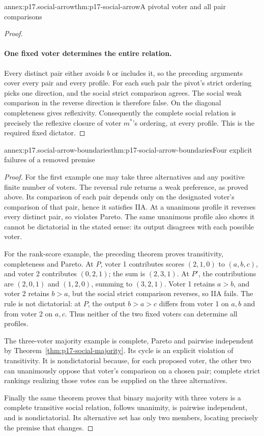 \begin{annexitem}{annex:p17.social-arrow}{thm:p17-social-arrow}{A pivotal voter and all pair comparisons}
\begin{proof}
\paragraph{One fixed voter determines the entire relation.}
Every distinct pair either avoids \(b\) or includes it, so the preceding
arguments cover every pair and every profile. For each such pair the
pivot's strict ordering picks one direction, and the social strict
comparison agrees. The social weak comparison in the reverse direction
is therefore false. On the diagonal completeness gives reflexivity.
Consequently the complete social relation is precisely the reflexive
closure of voter \(m^*\)'s ordering, at every profile. This is the
required fixed dictator.
\end{proof}
\end{annexitem}

\begin{annexitem}{annex:p17.social-arrow-boundaries}{thm:p17-social-arrow-boundaries}{Four explicit failures of a removed premise}
\begin{proof}
For the first example one may take three alternatives and any positive
finite number of voters. The reversal rule returns a weak preference,
as proved above. Its comparison of each pair depends only on the
designated voter's comparison of that pair, hence it satisfies IIA.
At a unanimous profile it reverses every distinct pair, so violates
Pareto. The same unanimous profile also shows it cannot be dictatorial
in the stated sense: its output disagrees with each possible voter.

For the rank-score example, the preceding theorem proves transitivity,
completeness and Pareto. At \(P\), voter 1 contributes scores
\((2,1,0)\) to \((a,b,c)\), and voter 2 contributes \((0,2,1)\);
the sum is \((2,3,1)\). At \(P'\), the contributions are
\((2,0,1)\) and \((1,2,0)\), summing to \((3,2,1)\).
Voter 1 retains \(a>b\), and voter 2 retains \(b>a\), but the social
strict comparison reverses, so IIA fails. The rule is not dictatorial:
at \(P\), the output \(b>a>c\) differs from voter 1 on \(a,b\) and
from voter 2 on \(a,c\). Thus neither of the two fixed voters can
determine all profiles.

The three-voter majority example is complete, Pareto and pairwise
independent by Theorem~\ref{thm:p17-social-majority}. Its cycle is an
explicit violation of transitivity. It is nondictatorial because, for
each proposed voter, the other two can unanimously oppose that voter's
comparison on a chosen pair; complete strict rankings realizing those
votes can be supplied on the three alternatives.

Finally the same theorem proves that binary majority with three voters
is a complete transitive social relation, follows unanimity, is pairwise
independent, and is nondictatorial. Its alternative set has only two
members, locating precisely the premise that changes.
\end{proof}
\end{annexitem}

